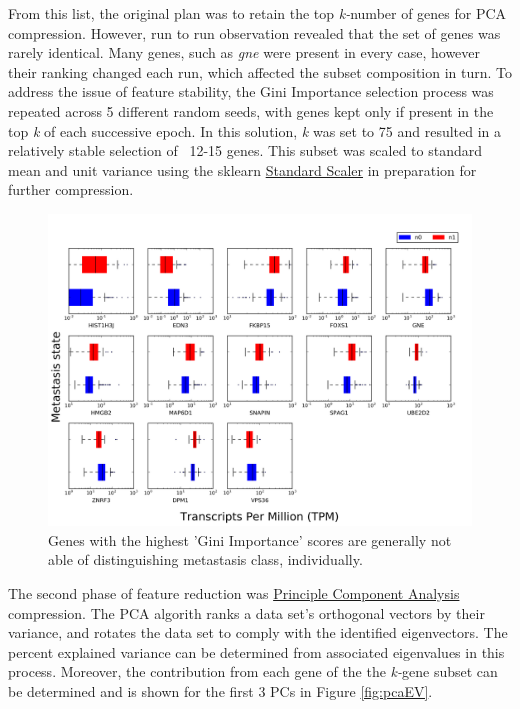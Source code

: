 \documentclass[final]{article}
\begin{document}
From this list, the original plan was to retain the top \textit{k-}number of
genes for PCA compression.  However, run to run observation revealed that the
set of genes  was rarely identical.  Many genes, such as \textit{gne} were
present in every case, however their ranking changed each run, which affected
the subset composition in turn.  To address the issue of feature stability, the Gini
Importance selection process was repeated across 5 different random seeds, with
genes kept only if present in the top \textit{k} of each successive epoch.  In this
solution, \textit{k} was set to 75 and resulted in a relatively stable selection of
~12-15 genes.  This subset was scaled to standard mean and unit variance using the sklearn
\href{http://scikit-learn.org/stable/modules/generated/sklearn.preprocessing.StandardScaler.html#sklearn.preprocessing.StandardScaler}{Standard Scaler} in preparation for further compression.

\begin{figure}[h!]
  \centering
  \includegraphics[width=\textwidth]{boxplots}
  \caption{\label{fig:separate}Genes with the highest 'Gini Importance' scores are generally not able of distinguishing metastasis class, individually.}
\end{figure}


The second phase of feature reduction was \href{http://scikit-learn.org/stable/modules/generated/sklearn.decomposition.PCA.html#sklearn.decomposition.PCA}{Principle Component Analysis}
compression. The PCA algorith ranks a data set's orthogonal vectors by their variance, and rotates the data set to comply with the identified eigenvectors.  The percent explained
variance can be determined from associated eigenvalues in this process.  Moreover, the contribution
from each gene of the the \textit{k-}gene subset can be determined and is shown for the first
3 PCs in Figure \ref{fig:pcaEV}.
\end{document}
